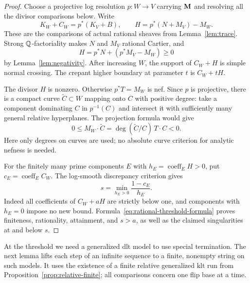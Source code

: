\begin{proof}
Choose a projective log resolution $p:W\to V$ carrying $\mathbf M$ and resolving
all the divisor comparisons below.  Write
\[
 K_W+C_W=p^*(K_V+B),\qquad
 H=p^*(N+M_V)-M_W.
\]
These are the comparisons of actual rational sheaves from
Lemma~\ref{lem:trace}.  Strong $\mathbb Q$-factoriality makes $N$ and $M_V$
rational Cartier, and
\begin{equation}\label{eq:threshold-defect}
 H=p^*N+(p^*M_V-M_W)\geq0
\end{equation}
by Lemma~\ref{lem:negativity}.  After increasing $W$, the support of
$C_W+H$ is simple normal crossing.  The crepant higher boundary at
parameter $t$ is $C_W+tH$.

The divisor $H$ is nonzero.  Otherwise $p^*T=M_W$ is nef.  Since $p$ is
projective, there is a compact curve $\widetilde C\subset W$ mapping onto
$C$ with positive degree: take a component dominating $C$ in $p^{-1}(C)$
and intersect it with sufficiently many general relative hyperplanes.
The projection formula would give
\[
 0\leq M_W\cdot\widetilde C
   =\deg(\widetilde C/C)\,T\cdot C<0.
\]
Here only degrees on curves are used; no absolute curve criterion for
analytic nefness is needed.

For the finitely many prime components $E$ with
$h_E=\operatorname{coeff}_E H>0$, put
$c_E=\operatorname{coeff}_E C_W$.  The log-smooth discrepancy criterion
gives
\begin{equation}\label{eq:rational-threshold-formula}
 s=\min_{h_E>0}\frac{1-c_E}{h_E}.
\end{equation}
Indeed all coefficients of $C_W+aH$ are strictly below one, and components
with $h_E=0$ impose no new bound.  Formula~\eqref{eq:rational-threshold-formula}
proves finiteness, rationality, attainment, and $s>a$, as well as the
claimed singularities at and below $s$.
\end{proof}

At the threshold we need a generalized dlt model to use special
termination.  The next lemma lifts each step of an infinite sequence to
a finite, nonempty string on such models.  It uses the existence of a
finite relative generalized klt run from
Proposition~\ref{prop:relative-finite}; all comparisons concern one flip
base at a time.

